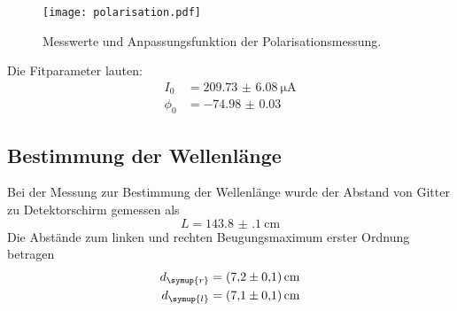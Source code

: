 \begin{figure}[H]
  \centering
  \texttt{[image: polarisation.pdf]}
  \caption{Messwerte und Anpassungsfunktion der Polarisationsmessung.}
  \label{fig:polarisation}
\end{figure}

Die Fitparameter lauten:
\begin{align*}
  I_0 &= \SI{209.73(608)}{\micro\ampere} \\
  \phi_0 &= \SI{-74.98(3)}{}
\end{align*}

\subsection{Bestimmung der Wellenlänge}
Bei der Messung zur Bestimmung der Wellenlänge wurde der Abstand von Gitter zu
Detektorschirm gemessen als
\begin{equation*}
  L = \SI{143.8(1)}{\centi\meter}
\end{equation*}
Die Abstände zum linken und rechten Beugungsmaximum erster Ordnung betragen
\begin{align*}
  d_\symup{r} &= \SI{7.2(1)}{\centi\meter} \\
  d_\symup{l} &= \SI{7.1(1)}{\centi\meter}
\end{align*}
